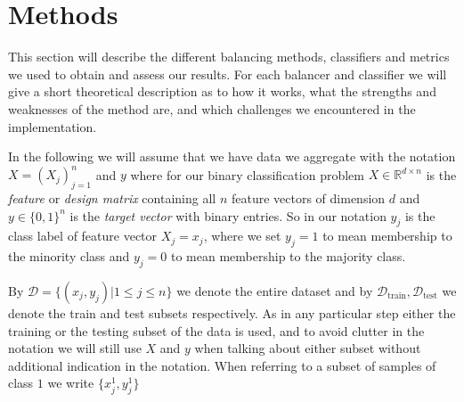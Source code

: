 \section{Methods}

This section will describe the different balancing methods, classifiers and metrics we used to obtain and assess our results.
For each balancer and classifier we will give a short theoretical description as to how it works, what the strengths and weaknesses of the method are,
and which challenges we encountered in the implementation.

In the following we will assume that we have data we aggregate with the notation $X = (X_j)_{j=1}^n$ and $y$ 
where for our binary classification problem $X \in \mathbb{R}^{d\times n}$ is the \textit{feature} or \textit{design matrix} containing all $n$ feature vectors of dimension $d$ 
and $y \in \{0,1\}^n$ is the \textit{target vector} with binary entries.
So in our notation $y_j$ is the class label of feature vector $X_j = x_j$, where we set $y_j = 1$ to mean membership to the minority class and $y_j = 0$ 
to mean membership to the majority class.

By $\mathcal{D} = \{(x_j, y_j) | 1 \leq j \leq n\}$ we denote the entire dataset and by $\mathcal{D}_\text{train}, \mathcal{D}_\text{test}$ 
we denote the train and test subsets respectively. As in any particular step either the training or the testing subset of the data is used, 
and to avoid clutter in the notation we will still use $X$ and $y$ when talking about either subset without additional indication in the notation.
When referring to a subset of samples of class $1$ we write $\{x_j^1, y_j^1 \}$
